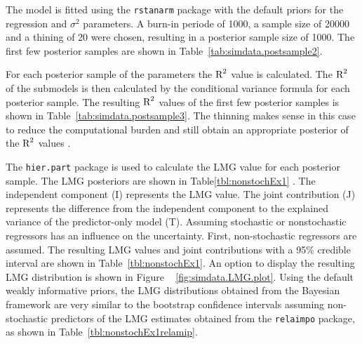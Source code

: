 \documentclass[11pt,a4paper,twoside]{book}
\begin{document}
The model is fitted using the \texttt{rstanarm} package \citep{rstanarm} with the default priors for the regression and $\sigma^2$ parameters.  A burn-in periode of 1000, a sample size of 20000 and a thining of 20 were chosen, resulting in a posterior sample size of 1000. The first few posterior samples are shown in Table~\ref{tab:simdata.postsample2}. 

For each posterior sample of the parameters the $\text{R}^2$ value is calculated. The $\text{R}^2$ of the submodels is then calculated by the conditional variance formula for each posterior sample. The resulting $\text{R}^2$ values of the first few posterior samples is shown in Table~\ref{tab:simdata.postsample3}.  The thinning makes sense in this case to reduce the computational burden and still obtain an appropriate posterior of the $\text{R}^2$ values \citep{Link2012}. 

The \texttt{hier.part} package is used to calculate the LMG value for each posterior sample. The LMG posteriors are shown in Table\ref{tbl:nonstochEx1} . The independent component (I) represents the LMG value. The joint contribution (J) represents the difference from the independent component to the explained variance of the predictor-only model (T). Assuming stochastic or nonstochastic regressors has an influence on the uncertainty. First, non-stochastic regressors are assumed. The resulting LMG values and joint contributions with a 95\% credible interval are shown in Table~\ref{tbl:nonstochEx1}. An option to display the resulting LMG distribution is shown in Figure ~ \ref{fig:simdata.LMG.plot}.  Using the default weakly informative priors, the LMG distributions obtained from the Bayesian framework are very similar to the bootstrap confidence intervals assuming non-stochastic predictors of the LMG estimates obtained from the \texttt{relaimpo} package, as shown in Table~\ref{tbl:nonstochEx1relamip}. 
\end{document}

